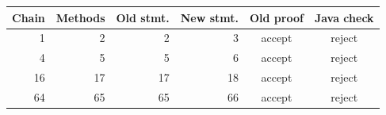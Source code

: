 \begin{tabular}{rrrrcc}
\toprule
Chain & Methods & Old stmt. & New stmt. & Old proof & Java check \\
\midrule
1 & 2 & 2 & 3 & accept & reject \\
4 & 5 & 5 & 6 & accept & reject \\
16 & 17 & 17 & 18 & accept & reject \\
64 & 65 & 65 & 66 & accept & reject \\
\bottomrule
\end{tabular}
